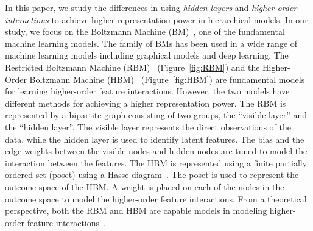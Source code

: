 \documentclass[letterpaper]{article} %
\begin{document}
	In this paper, we study the differences in using \textit{hidden layers} and \textit{higher-order interactions} to achieve higher representation power in hierarchical models. In our study, we focus on the Boltzmann Machine (BM)~\cite{ackley1987learning}, one of the fundamental machine learning models. The family of BMs has been used in a wide range of machine learning models including graphical models and deep learning. The Restricted Boltzmann Machine (RBM)~\cite{hinton2012practical} (Figure~\ref{fig:RBM}) and the Higher-Order Boltzmann Machine (HBM)~\cite{sejnowski1986higher,min2014interpretable} (Figure~\ref{fig:HBM}) are fundamental models for learning higher-order feature interactions. However, the two models have different methods for achieving a higher representation power. The RBM is represented by a bipartite graph consisting of two groups, the ``visible layer'' and the ``hidden layer''. The visible layer represents the direct observations of the data, while the hidden layer is used to identify latent features. The bias and the edge weights between the visible nodes and hidden nodes are tuned to model the interaction between the features. The HBM is represented using a finite partially ordered set (poset) using a Hasse diagram~\cite{davey2002introduction,gierz2003continuous}. The poset is used to represent the outcome space of the HBM. A weight is placed on each of the nodes in the outcome space to model the higher-order feature interactions. From a theoretical perspective, both the RBM and HBM are capable models in modeling higher-order feature interactions~\cite{le2008representational}.
\end{document}
